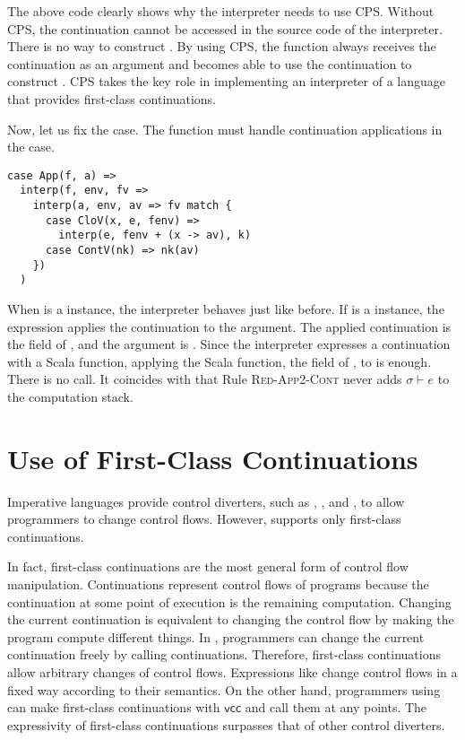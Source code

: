 The above code clearly shows why the interpreter needs to use CPS. Without CPS,
the continuation cannot be accessed in the source code of the interpreter. There
is no way to construct . By using CPS, the  function
always receives the continuation as an argument and becomes able to use the continuation to
construct . CPS takes the key role in implementing an interpreter of
a language that provides first-class continuations.

Now, let us fix the  case.
The  function must handle continuation applications in the
 case.

\begin{verbatim}
case App(f, a) =>
  interp(f, env, fv =>
    interp(a, env, av => fv match {
      case CloV(x, e, fenv) =>
        interp(e, fenv + (x -> av), k)
      case ContV(nk) => nk(av)
    })
  )
\end{verbatim}

When  is a  instance, the interpreter behaves just like before.
If  is a  instance, the expression applies the continuation
to the argument. The applied continuation is the field of , and the argument
is . Since the interpreter expresses a continuation with a Scala function,
applying the Scala function, the field of , to  is enough.
There is no  call. It coincides with that Rule \textsc{Red-App2-Cont}
never adds $\sigma\vdash e$ to the computation stack.

\section{Use of First-Class Continuations}

Imperative languages provide control diverters, such as ,
, and , to allow programmers to change control
flows. However, \Lang supports only first-class continuations.

In fact, first-class continuations are the most general form of control flow
manipulation. Continuations represent control flows of programs because the
continuation at some point of execution is the remaining computation.
Changing the current continuation is equivalent to changing the control flow by
making the program compute different things.
In \Lang, programmers can change the current
continuation freely by calling continuations. Therefore, first-class
continuations allow arbitrary changes of control flows.
Expressions like  change control flows in a fixed way according
to their semantics. On the other hand, programmers using \Lang can make first-class
continuations with $\textsf{vcc}$ and call them at any points. The expressivity of
first-class continuations surpasses that of other control diverters.

